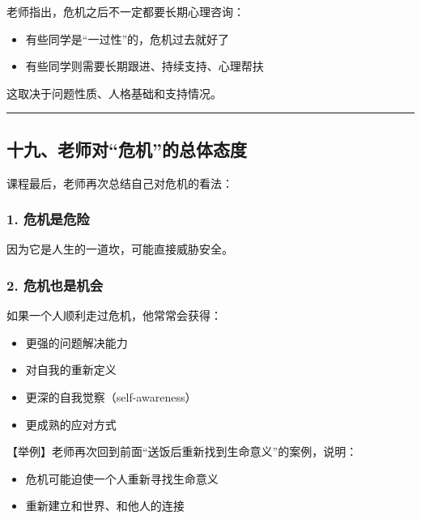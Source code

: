 \documentclass[
  chinese,
  9pt,
  a4paper,
]{ctexart}
\providecommand{\tightlist}{%
  \setlength{\itemsep}{0pt}\setlength{\parskip}{0pt}}
\begin{document}
老师指出，危机之后不一定都要长期心理咨询：

\begin{itemize}
\tightlist
\item
  有些同学是``一过性''的，危机过去就好了
\item
  有些同学则需要长期跟进、持续支持、心理帮扶
\end{itemize}

这取决于问题性质、人格基础和支持情况。

\begin{center}\rule{0.5\linewidth}{0.5pt}\end{center}

\subsection{十九、老师对``危机''的总体态度}\label{ux5341ux4e5dux8001ux5e08ux5bf9ux5371ux673aux7684ux603bux4f53ux6001ux5ea6}

课程最后，老师再次总结自己对危机的看法：

\subsubsection{1. 危机是危险}\label{ux5371ux673aux662fux5371ux9669}

因为它是人生的一道坎，可能直接威胁安全。

\subsubsection{2.
危机也是机会}\label{ux5371ux673aux4e5fux662fux673aux4f1a}

如果一个人顺利走过危机，他常常会获得：

\begin{itemize}
\tightlist
\item
  更强的问题解决能力
\item
  对自我的重新定义
\item
  更深的自我觉察（self-awareness）
\item
  更成熟的应对方式
\end{itemize}

【举例】老师再次回到前面``送饭后重新找到生命意义''的案例，说明：

\begin{itemize}
\tightlist
\item
  危机可能迫使一个人重新寻找生命意义
\item
  重新建立和世界、和他人的连接
\end{itemize}
\end{document}
